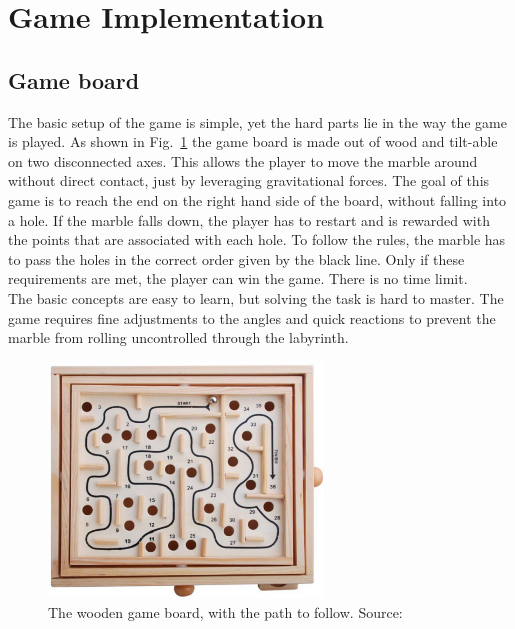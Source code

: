 

\section{Game Implementation}\label{sec:game-implementation}

\subsection{Game board}\label{subsec:game-board}
The basic setup of the game is simple, yet the hard parts lie in the way the game is played.
As shown in Fig.~\ref{fig:wooden_board} the game board is made out of wood and tilt-able on two disconnected axes.
This allows the player to move the marble around without direct contact, just by leveraging gravitational forces.
The goal of this game is to reach the end on the right hand side of the board, without falling into a hole.
If the marble falls down, the player has to restart and is rewarded with the points that are associated with each hole.
To follow the rules, the marble has to pass the holes in the correct order given by the black line.
Only if these requirements are met, the player can win the game.
There is no time limit.\\
The basic concepts are easy to learn, but solving the task is hard to master.
The game requires fine adjustments to the angles and quick reactions to prevent the marble from rolling uncontrolled through
the labyrinth.

\begin{figure}[h]
    \centering
    \includegraphics[width=0.65\textwidth]{images/wooden_game_board}
    \caption{The wooden game board, with the path to follow. Source:~\cite{wooden_board}}
    \label{fig:wooden_board}
\end{figure}

